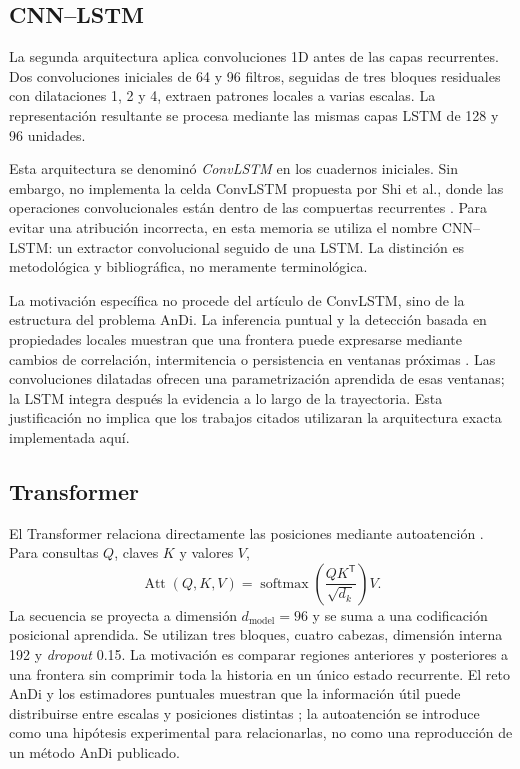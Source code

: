 \documentclass[a4paper,12pt]{article}
\begin{document}
\subsection{CNN--LSTM}

La segunda arquitectura aplica convoluciones 1D antes de las capas recurrentes. Dos convoluciones iniciales de 64 y 96 filtros, seguidas de tres bloques residuales con dilataciones 1, 2 y 4, extraen patrones locales a varias escalas. La representación resultante se procesa mediante las mismas capas LSTM de 128 y 96 unidades.

Esta arquitectura se denominó \emph{ConvLSTM} en los cuadernos iniciales. Sin embargo, no implementa la celda ConvLSTM propuesta por Shi et al., donde las operaciones convolucionales están dentro de las compuertas recurrentes \cite{shi2015convlstm}. Para evitar una atribución incorrecta, en esta memoria se utiliza el nombre CNN--LSTM: un extractor convolucional seguido de una LSTM. La distinción es metodológica y bibliográfica, no meramente terminológica.

La motivación específica no procede del artículo de ConvLSTM, sino de la estructura del problema AnDi. La inferencia puntual y la detección basada en propiedades locales muestran que una frontera puede expresarse mediante cambios de correlación, intermitencia o persistencia en ventanas próximas \cite{requena2023pointwise,seckler2024changepoint}. Las convoluciones dilatadas ofrecen una parametrización aprendida de esas ventanas; la LSTM integra después la evidencia a lo largo de la trayectoria. Esta justificación no implica que los trabajos citados utilizaran la arquitectura exacta implementada aquí.

\subsection{Transformer}

El Transformer relaciona directamente las posiciones mediante autoatención \cite{vaswani2017attention}. Para consultas $Q$, claves $K$ y valores $V$,
\begin{equation}
  \operatorname{Att}(Q,K,V)=\operatorname{softmax}\!\left(\frac{QK^{\mathsf T}}{\sqrt{d_k}}\right)V.
  \label{eq:attention}
\end{equation}
La secuencia se proyecta a dimensión $d_{\mathrm{model}}=96$ y se suma a una codificación posicional aprendida. Se utilizan tres bloques, cuatro cabezas, dimensión interna 192 y \emph{dropout} 0.15. La motivación es comparar regiones anteriores y posteriores a una frontera sin comprimir toda la historia en un único estado recurrente. El reto AnDi y los estimadores puntuales muestran que la información útil puede distribuirse entre escalas y posiciones distintas \cite{munozgil2021objective,requena2023pointwise}; la autoatención se introduce como una hipótesis experimental para relacionarlas, no como una reproducción de un método AnDi publicado.
\end{document}
